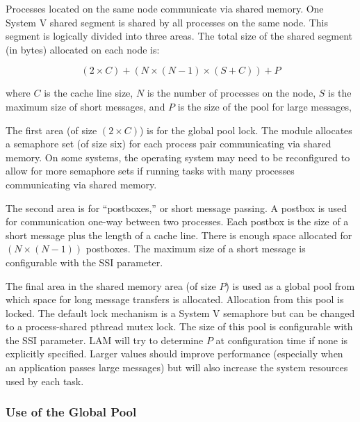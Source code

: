 Processes located on the same node communicate via shared memory.  One
System V shared segment is shared by all processes on the same node.
This segment is logically divided into three areas.  The total size of
the shared segment (in bytes) allocated on each node is:

\[ 
(2 \times C) + (N \times (N-1) \times (S + C)) + P
\]

where $C$ is the cache line size, $N$ is the number of processes on
the node, $S$ is the maximum size of short messages, and $P$ is the
size of the pool for large messages,

The first area (of size $(2 \times C)$) is for the global pool lock.
The  module allocates a semaphore set (of size six) for each
process pair communicating via shared memory.  On some systems, the
operating system may need to be reconfigured to allow for more
semaphore sets if running tasks with many processes communicating via
shared memory.

The second area is for ``postboxes,'' or short message passing.  A
postbox is used for communication one-way between two processes.  Each
postbox is the size of a short message plus the length of a cache
line.  There is enough space allocated for $(N \times (N-1))$
postboxes.  The maximum size of a short message is configurable with
the  SSI parameter.



The final area in the shared memory area (of size $P$) is used as a
global pool from which space for long message transfers is allocated.
Allocation from this pool is locked.  The default lock mechanism is a
System V semaphore but can be changed to a process-shared pthread
mutex lock.  The size of this pool is configurable with the
 SSI parameter.  LAM will
try to determine $P$ at configuration time if none is explicitly
specified.  Larger values should improve performance (especially when
an application passes large messages) but will also increase the
system resources used by each task.


\subsubsection{Use of the Global Pool}
  
